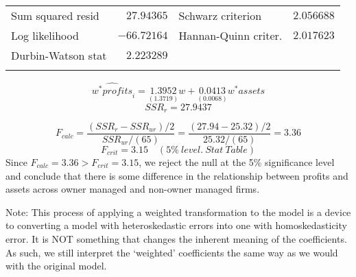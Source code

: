 \documentclass[12pt]{report}
\begin{document}
\begin{table}[H]
\begin{tabular}{lrrrr}
		\multicolumn{1}{l}{Sum squared resid}&\multicolumn{1}{r}{$27.94365$}&\multicolumn{2}{l}{Schwarz criterion}&\multicolumn{1}{r}{$2.056688$}\\
		\multicolumn{1}{l}{Log likelihood}&\multicolumn{1}{r}{$-66.72164$}&\multicolumn{2}{l}{Hannan-Quinn criter.}&\multicolumn{1}{r}{$2.017623$}\\
		\multicolumn{1}{l}{Durbin-Watson stat}&\multicolumn{1}{r}{$2.223289$}&\multicolumn{1}{c}{}&\multicolumn{1}{c}{}&\multicolumn{1}{c}{}\\
		[4.5pt] \hline \\ [-4.5pt]
	\end{tabular}
\end{table}
\vspace{-\baselineskip} $$\widehat{w^*profits}_i = \underset{(1.3719)}{1.3952}w + \underset{(0.0068)}{0.0413}w^*assets$$ $$SSR_r = 27.9437$$

$$F_{calc} = \dfrac{(SSR_r - SSR_{ur})/2}{SSR_{ur}/(65)} = \dfrac{(27.94-25.32)/2}{25.32/(65)} = 3.36$$
$$F_{crit} = 3.15 \quad (5\%\ level.\ Stat\ Table)$$
\noindent Since $F_{calc}=3.36 > F_{crit}=3.15$, we reject the null at the 5\% significance level and conclude that there is some difference in the relationship between profits and assets across owner managed and non-owner managed firms.

\noindent Note: This process of applying a weighted transformation to the model is a device to converting a model with heteroskedastic errors into one with homoskedasticity error. It is NOT something that changes the inherent meaning of the coefficients. As such, we still interpret the ‘weighted’ coefficients the same way as we would with the original model.
\end{document}
